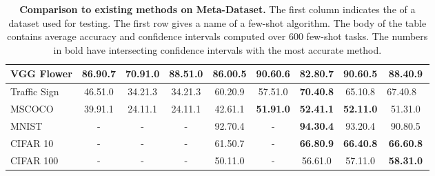 \documentclass[runningheads]{llncs}
\newcommand\bb[1]{\textbf{#1}}
\newcommand{\pms}[1]{{\scriptsize #1}}
\begin{document}
\begin{table}[t!]
\begin{center}
{\begin{tabular}{l| c c c c c c c c}
VGG Flower   &   86.9\pms{0.7} &  70.9\pms{1.0} &  88.5\pms{1.0} &       86.0\pms{0.5} &    \bb{90.6\pms{0.6}} &  82.8\pms{0.7}       &  \bb{90.6\pms{0.5}} &      88.4\pms{0.9}        \\
\hline                         
Traffic Sign &   46.5\pms{1.0} &  34.2\pms{1.3} &  34.2\pms{1.3} &       60.2\pms{0.9} &         57.5\pms{1.0} &  \bb{70.4\pms{0.8}}  &  65.1\pms{0.8}      &  67.4\pms{0.8}    \   \\
MSCOCO       &   39.9\pms{1.1} &  24.1\pms{1.1} &  24.1\pms{1.1} &       42.6\pms{1.1} &    \bb{51.9\pms{1.0}} &  \bb{52.4\pms{1.1}}  &  \bb{52.1\pms{1.0}} &      51.3\pms{1.0}    \\
MNIST        &               - &              - &              - &       92.7\pms{0.4} &                     - &  \bb{94.3\pms{0.4}}  &  93.2\pms{0.4}      &  90.8\pms{0.5}        \\
CIFAR 10     &               - &              - &              - &       61.5\pms{0.7} &                     - &  \bb{66.8\pms{0.9}}  &  \bb{66.4\pms{0.8}} &  \bb{66.6\pms{0.8}}   \\
CIFAR 100    &               - &              - &              - &       50.1\pms{1.0} &                     - &      56.6\pms{1.0}   &      57.1\pms{1.0}  &  \bb{58.3\pms{1.0}}   \\

\end{tabular}
}
\end{center}
\caption{\bb{Comparison to existing methods on Meta-Dataset.} The first column
  indicates the of a dataset used for testing. The first row gives a name
  of a few-shot algorithm. The body of the table contains average accuracy and
   confidence intervals computed over 600 few-shot tasks.  The numbers in
  bold have intersecting confidence intervals with the most accurate method.}
\label{tab:metadataset}
\end{table}
\end{document}
